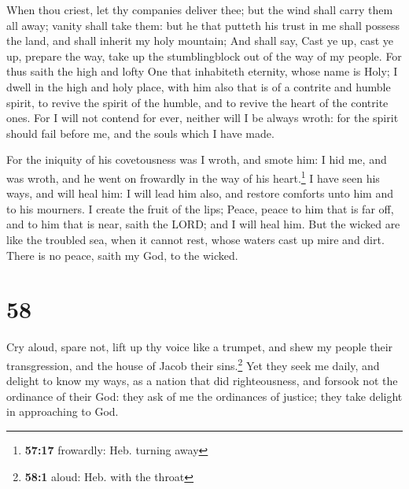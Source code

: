  When thou criest, let thy companies deliver thee; but
the wind shall carry them all away; vanity shall take them: but he that
putteth his trust in me shall possess the land, and shall inherit my
holy mountain;  And shall say, Cast ye up, cast ye up,
prepare the way, take up the stumblingblock out of the way of my people.
 For thus saith the high and lofty One that inhabiteth
eternity, whose name is Holy; I dwell in the high and holy place, with
him also that is of a contrite and humble spirit, to revive the spirit
of the humble, and to revive the heart of the contrite ones.
 For I will not contend for ever, neither will I be
always wroth: for the spirit should fail before me, and the souls which
I have made.

 For the iniquity of his covetousness was I wroth, and
smote him: I hid me, and was wroth, and he went on frowardly in the way
of his heart.\footnote{\textbf{57:17} frowardly: Heb. turning away}
 I have seen his ways, and will heal him: I will lead him
also, and restore comforts unto him and to his mourners. 
I create the fruit of the lips; Peace, peace to him that is far off, and
to him that is near, saith the LORD; and I will heal him.
 But the wicked are like the troubled sea, when it cannot
rest, whose waters cast up mire and dirt.  There is no
peace, saith my God, to the wicked.

\hypertarget{section-57}{%
\section{58}\label{section-57}}

 Cry aloud, spare not, lift up thy voice like a trumpet,
and shew my people their transgression, and the house of Jacob their
sins.\footnote{\textbf{58:1} aloud: Heb. with the throat} 
Yet they seek me daily, and delight to know my ways, as a nation that
did righteousness, and forsook not the ordinance of their God: they ask
of me the ordinances of justice; they take delight in approaching to
God.

